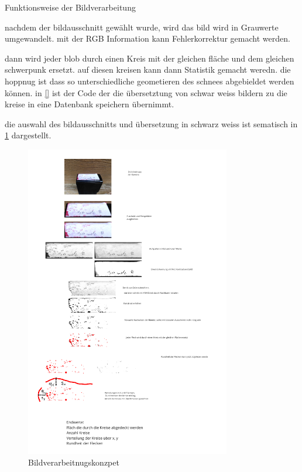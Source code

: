Funktionsweise der Bildverarbeitung

nachdem der bildausschnitt gewählt wurde, wird das bild wird in Grauwerte umgewandelt. mit der RGB Information kann Fehlerkorrektur gemacht werden.

dann wird jeder blob durch einen Kreis mit der gleichen fläche und dem gleichen schwerpunk ersetzt. auf diesen kreisen kann dann Statistik gemacht weredn. die hoppnug ist dass so unterschiedliche geometieren des schnees abgebieldet werden können. in \ref{} ist der Code der die übersetztung von schwar weiss bildern zu die kreise in eine Datenbank speichern übernimmt.

die auswahl des bildausschnitts und übersetzung in schwarz weiss ist sematisch in \ref{fig:Bildverarbeitnugskonzpet} dargestellt.


\begin{figure}
    \centering
    \includegraphics[width=0.8\textwidth]{Bilder/Screenshotfrom2024-04-0112-59-42.png}
    \caption{Bildverarbeitnugskonzpet}
    \label{fig:Bildverarbeitnugskonzpet}
\end{figure}

\newpage
